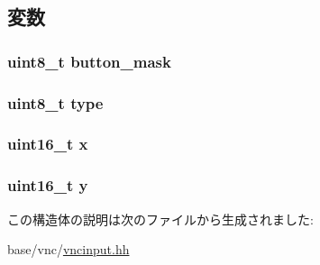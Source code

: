\subsection{変数}
\hypertarget{structVncInput_1_1PointerEventMessage_a2027ef457ba027a1b76be724a77676c7}{
\subsubsection[{button\_\-mask}]{\setlength{\rightskip}{0pt plus 5cm}uint8\_\-t {\bf button\_\-mask}}}
\label{structVncInput_1_1PointerEventMessage_a2027ef457ba027a1b76be724a77676c7}
\hypertarget{structVncInput_1_1PointerEventMessage_a1d127017fb298b889f4ba24752d08b8e}{
\subsubsection[{type}]{\setlength{\rightskip}{0pt plus 5cm}uint8\_\-t {\bf type}}}
\label{structVncInput_1_1PointerEventMessage_a1d127017fb298b889f4ba24752d08b8e}
\hypertarget{structVncInput_1_1PointerEventMessage_a4dde988b1b2adba65ae3efa69f65d960}{
\subsubsection[{x}]{\setlength{\rightskip}{0pt plus 5cm}uint16\_\-t {\bf x}}}
\label{structVncInput_1_1PointerEventMessage_a4dde988b1b2adba65ae3efa69f65d960}
\hypertarget{structVncInput_1_1PointerEventMessage_ab0580f504a7428539be299fa71565f30}{
\subsubsection[{y}]{\setlength{\rightskip}{0pt plus 5cm}uint16\_\-t {\bf y}}}
\label{structVncInput_1_1PointerEventMessage_ab0580f504a7428539be299fa71565f30}


この構造体の説明は次のファイルから生成されました:\begin{DoxyCompactItemize}
\item 
base/vnc/\hyperlink{vncinput_8hh}{vncinput.hh}\end{DoxyCompactItemize}
